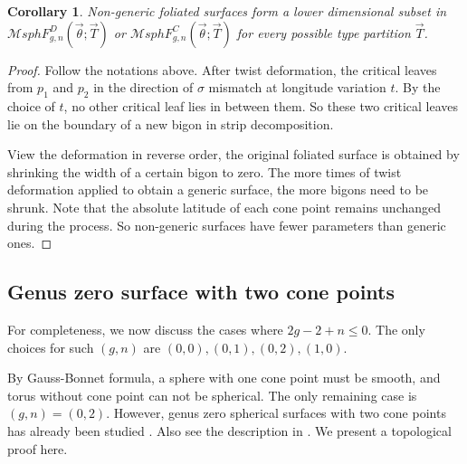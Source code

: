 \documentclass[pdflatex,sn-mathphys]{sn-jnl}%
\numberwithin{equation}{section}
\theoremstyle{thmstyleone}%
\newtheorem{corollary}[theorem]{Corollary}
\newtheorem{remark}[theorem]{Remark}%
\newcommand{\MsphgnDFT}{\mathcal{M}sphF_{g,n}^D(\vec{\theta};\vec{T})}
\newcommand{\MsphgnCFT}{\mathcal{M}sphF_{g,n}^C(\vec{\theta};\vec{T})}
\begin{document}
\begin{corollary}\label{cor:low_dim}
    Non-generic foliated surfaces form a lower dimensional subset in $\MsphgnDFT$ or $\MsphgnCFT$ for every possible type partition $\vec{T}$.
\end{corollary}
\begin{proof}
    Follow the notations above. After twist deformation, the critical leaves from $p_1$ and $p_2$ in the direction of $\sigma$ mismatch at longitude variation $t$. By the choice of $t$, no other critical leaf lies in between them. So these two critical leaves lie on the boundary of a new bigon in strip decomposition.

    View the deformation in reverse order, the original foliated surface is obtained by shrinking the width of a certain bigon to zero.
    The more times of twist deformation applied to obtain a generic surface, the more bigons need to be shrunk. Note that the absolute latitude of each cone point remains unchanged during the process. So non-generic surfaces have fewer parameters than generic ones.
\end{proof}


\subsection{Genus zero surface with two cone points}\label{sec:2cone_sphere}
For completeness, we now discuss the cases where $2g-2+n\leq0$. The only choices for such $(g,n)$ are $(0,0),(0,1),(0,2),(1,0)$. 

By Gauss-Bonnet formula, a sphere with one cone point must be smooth, and torus without cone point can not be spherical. 
The only remaining case is $(g,n)=(0,2)$. However, genus zero spherical surfaces with two cone points has already been studied \cite{Tro91}. %
Also see the description in \cite[Theorem 2.10]{Tah22}. 
We present a topological proof here.
\end{document}
